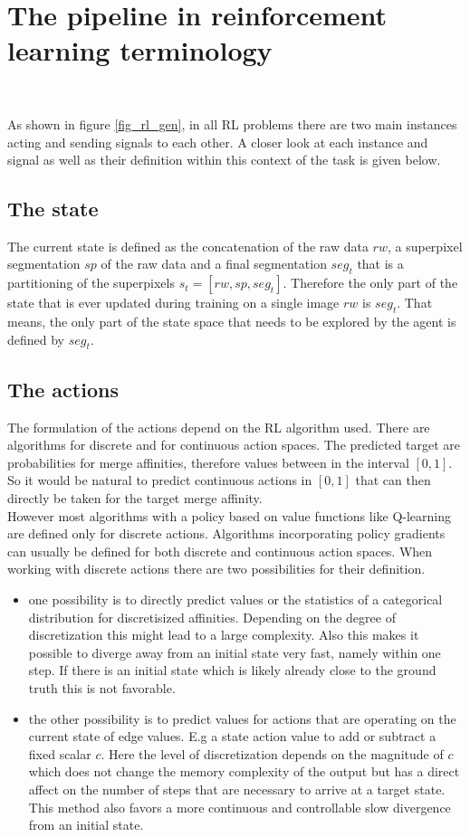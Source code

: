 \section{The pipeline in reinforcement learning terminology}~\label{seg:pip_tl_term}

As shown in figure \ref{fig_rl_gen}, in all RL problems there are two main instances acting and sending signals to each other. A closer look at each instance and signal as well as their definition within this context of the task is given below. 

\subsection{The state}
The current state is defined as the concatenation of the raw data $rw$, a superpixel segmentation $sp$ of the raw data and a final segmentation $seg_t$ that is a partitioning of the superpixels $s_t=\left[ rw, sp, seg_t \right]$. Therefore the only part of the state that is ever updated during training on a single image $rw$ is $seg_t$. That means, the only part of the state space that needs to be explored by the agent is defined by $seg_t$.
\subsection{The actions}
The formulation of the actions depend on the RL algorithm used. There are algorithms for discrete and for continuous action spaces. The predicted target are probabilities for merge affinities, therefore values between in the interval $[0, 1]$. So it would be natural to predict continuous actions in $[0, 1]$ that can then directly be taken for the target merge affinity.\\
However most algorithms with a policy based on value functions like Q-learning are defined only for discrete actions. Algorithms incorporating policy gradients can usually be defined for both discrete and continuous action spaces. When working with discrete actions there are two possibilities for their definition. \\
\begin{itemize}
	\item one possibility is to directly predict values or the statistics of a categorical distribution for discretisized affinities. Depending on the degree of discretization this might lead to a large complexity. Also this makes it possible to diverge away from an initial state very fast, namely within one step. If there is an initial state which is likely already close to the ground truth this is not favorable.
	\item the other possibility is to predict values for actions that are operating on the current state of edge values. E.g a state action value to add or subtract a fixed scalar $c$. Here the level of discretization depends on the magnitude of $c$ which does not change the memory complexity of the output but has a direct affect on the number of steps that are necessary to arrive at a target state. This method also favors a more continuous and controllable slow divergence from an initial state.
\end{itemize}

